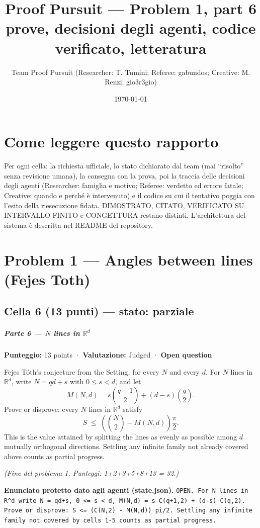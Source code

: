 \documentclass[11pt,a4paper]{article}
\title{Proof Pursuit --- Problem 1, part 6\\ \large prove, decisioni degli agenti, codice verificato, letteratura}
\author{Team Proof Pursuit (Researcher: T. Tumini; Referee: gabundos; Creative: M. Renzi; gio3r3gio)}
\date{\today}
\begin{document}
\maketitle\tableofcontents
\section*{Come leggere questo rapporto}
Per ogni cella: la richiesta ufficiale, lo stato dichiarato dal team (mai ``risolto'' senza revisione umana), la consegna
con la prova, poi la traccia delle decisioni degli agenti (Researcher: famiglia e motivo; Referee: verdetto ed errore
fatale; Creative: quando e perché è intervenuto) e il codice su cui il tentativo poggia con l'esito della riesecuzione
fidata. DIMOSTRATO, CITATO, VERIFICATO SU INTERVALLO FINITO e CONGETTURA restano distinti. L'architettura del sistema
è descritta nel README del repository.
\section{Problem 1 — Angles between lines (Fejes Toth)}
\subsection{Cella 6 (13 punti) — stato: parziale}
\subparagraph{\texorpdfstring{Parte 6 --- \(N\) lines in
\(\mathbb{R}^d\)}{Parte 6 --- N lines in \textbackslash mathbb\{R\}\^{}d}}\label{parte-6-n-lines-in-mathbbrd}

\textbf{Punteggio:} 13 points · \textbf{Valutazione:} Judged ·
\textbf{Open question}

Fejes Tóth's conjecture from the Setting, for every \(N\) and every
\(d\). For \(N\) lines in \(\mathbb{R}^d\), write \(N = qd + s\) with
\(0 \le s < d\), and let \[
M(N,d) = s \binom{q+1}{2} + (d-s) \binom{q}{2}.
\] Prove or disprove: every \(N\) lines in \(\mathbb{R}^d\) satisfy \[
S \;\le\; \left( \binom{N}{2} - M(N,d) \right) \frac{\pi}{2}.
\] This is the value attained by splitting the lines as evenly as
possible among \(d\) mutually orthogonal directions. Settling any
infinite family not already covered above counts as partial progress.

\emph{(Fine del problema 1. Punteggi: 1+2+3+5+8+13 = 32.)}

\textbf{Enunciato protetto dato agli agenti (state.json).} \texttt{OPEN. For N lines in R\textasciicircum{}d write N = qd+s, 0 \textless{}= s \textless{} d, M(N,d) = s C(q+1,2) + (d-s) C(q,2). Prove or disprove: S \textless{}= (C(N,2) - M(N,d)) pi/2. Settling any infinite family not covered by cells 1-5 counts as partial progress.}
\end{document}
